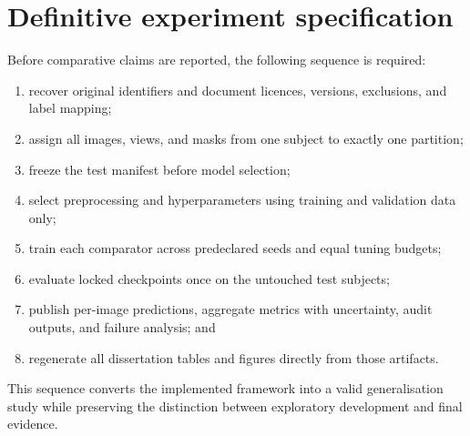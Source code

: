 \section{Definitive experiment specification}
Before comparative claims are reported, the following sequence is required:

\begin{enumerate}
    \item recover original identifiers and document licences, versions, exclusions, and label mapping;
    \item assign all images, views, and masks from one subject to exactly one partition;
    \item freeze the test manifest before model selection;
    \item select preprocessing and hyperparameters using training and validation data only;
    \item train each comparator across predeclared seeds and equal tuning budgets;
    \item evaluate locked checkpoints once on the untouched test subjects;
    \item publish per-image predictions, aggregate metrics with uncertainty, audit outputs, and failure analysis; and
    \item regenerate all dissertation tables and figures directly from those artifacts.
\end{enumerate}

This sequence converts the implemented framework into a valid generalisation study while preserving the distinction between exploratory development and final evidence.
